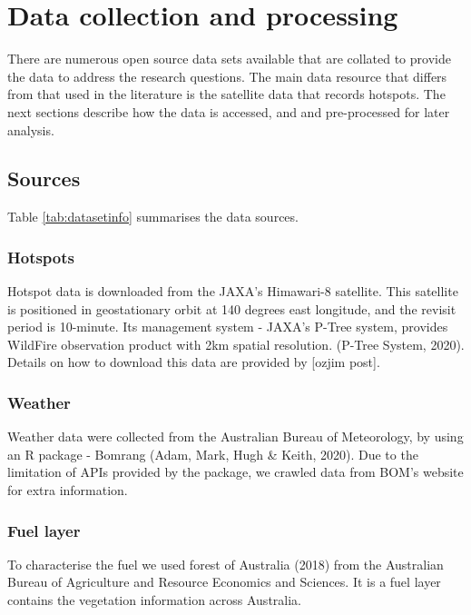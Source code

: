 \documentclass{monashthesis}
\begin{document}
\chapter{Data collection and
processing}\label{data-collection-and-processing}

There are numerous open source data sets available that are collated to
provide the data to address the research questions. The main data
resource that differs from that used in the literature is the satellite
data that records hotspots. The next sections describe how the data is
accessed, and and pre-processed for later analysis.

\section{Sources}\label{sources}

Table \ref{tab:datasetinfo} summarises the data sources.

\subsection{Hotspots}\label{hotspots}

Hotspot data is downloaded from the JAXA's Himawari-8 satellite. This
satellite is positioned in geostationary orbit at 140 degrees east
longitude, and the revisit period is 10-minute. Its management system -
JAXA's P-Tree system, provides WildFire observation product with 2km
spatial resolution. (P-Tree System, 2020). Details on how to download
this data are provided by {[}ozjim post{]}.

\subsection{Weather}\label{weather}

Weather data were collected from the Australian Bureau of Meteorology,
by using an R package - Bomrang (Adam, Mark, Hugh \& Keith, 2020). Due
to the limitation of APIs provided by the package, we crawled data from
BOM's website for extra information.

\subsection{Fuel layer}\label{fuel-layer}

To characterise the fuel we used forest of Australia (2018) from the
Australian Bureau of Agriculture and Resource Economics and Sciences. It
is a fuel layer contains the vegetation information across Australia.
\end{document}
